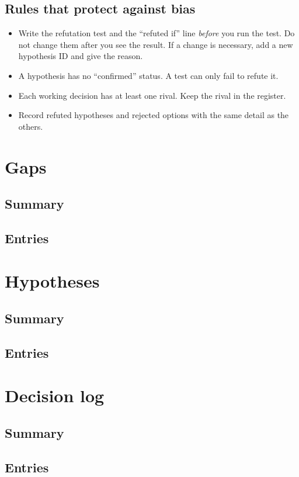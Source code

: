 \documentclass[11pt]{article}
\begin{document}
\subsection{Rules that protect against bias}
\begin{itemize}
  \item Write the refutation test and the ``refuted if'' line \emph{before} you run the test. Do not change them after you see the result. If a change is necessary, add a new hypothesis ID and give the reason.
  \item A hypothesis has no ``confirmed'' status. A test can only fail to refute it.
  \item Each working decision has at least one rival. Keep the rival in the register.
  \item Record refuted hypotheses and rejected options with the same detail as the others.
\end{itemize}

\clearpage
\section{Gaps}
\subsection{Summary}
\gapsummary
\subsection{Entries}
\gapentries

\clearpage
\section{Hypotheses}
\subsection{Summary}
\hypsummary
\subsection{Entries}
\hypentries

\clearpage
\section{Decision log}
\subsection{Summary}
\decsummary
\subsection{Entries}
\decentries
\end{document}
